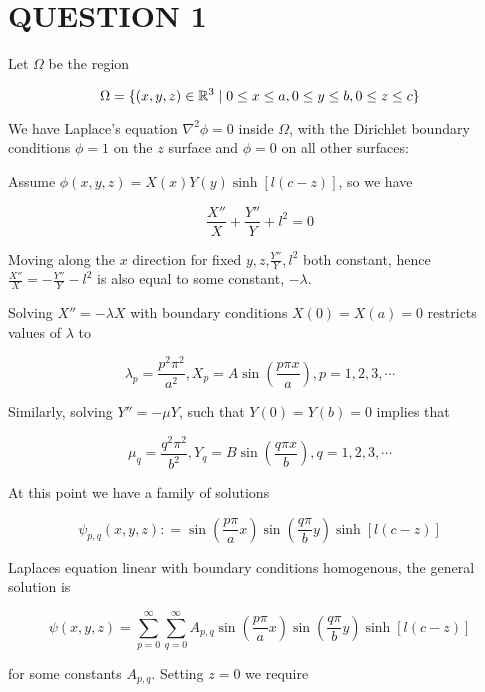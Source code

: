 \documentclass[a4paper]{article}
\begin{document}
	
\maketitle

\section{QUESTION 1}


Let $ \Omega $ be the region

\[ \Omega = \{  (x,y,z) \in \mathbb{R}^{3} \; | \; 0 \leq x \leq a, 0 \leq y \leq b, 0 \leq z \leq c  \} \]

We have Laplace's equation $ \nabla^{2} \phi = 0 $ inside $ \Omega $, with the Dirichlet boundary conditions $ \phi = 1 $ on the $ z $ surface and $ \phi = 0 $ on all other surfaces:

Assume $ \phi(x,y,z) = X(x) Y(y) \sinh [ l(c - z) ] $, so we have

\[ \frac{X''}{X} + \frac{Y''}{Y} + l^{2} = 0 \]

Moving along the $ x $ direction for fixed $ y,z $,$ \frac{Y''}{Y}, l^{2} $ both constant, hence $ \frac{X''}{X} = - \frac{Y''}{Y} - l^{2} $ is also equal to some constant, $ - \lambda $.

Solving $ X'' = - \lambda X $ with boundary conditions $ X(0) = X(a) = 0 $ restricts values of $ \lambda $ to

\[ \lambda_{p} = \frac{p^{2} \pi^{2}}{a^{2}}, X_{p} = A \sin \left( \frac{p \pi x}{a} \right), p = 1,2,3,\cdots  \]

Similarly, solving $ Y'' = - \mu Y  $, such that $ Y(0) = Y(b) = 0 $ implies that

\[ \mu_{q} = \frac{q^{2} \pi^{2}}{b^{2}}, Y_{q} = B \sin \left(  \frac{q \pi x}{b} \right), q = 1,2,3,\cdots  \]

At this point we have a family of solutions

\[ \psi_{p,q}(x,y,z) : = \sin \left(  \frac{p \pi}{a} x \right) \sin \left(  \frac{q \pi}{b} y \right)  \sinh \left[  l(c - z)\right]  \]

Laplaces equation linear with boundary conditions homogenous, the general solution is 

\[ \psi(x,y,z) 
=  \sum_{p = 0}^{\infty} \sum_{q = 0}^{\infty} A_{p,q} \sin \left(  \frac{p \pi}{a} x \right) \sin \left(  \frac{q \pi}{b} y \right)  \sinh \left[  l(c - z)\right]    \]


for some constants $ A_{p,q} $. Setting $ z = 0 $ we require
\end{document}
